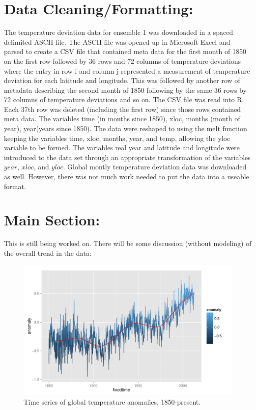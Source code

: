 \documentclass{article}\usepackage{graphicx, color}
\newenvironment{knitrout}{}{} %
\begin{document}
\section{Data Cleaning/Formatting:}
The temperature deviation data for ensemble 1 was downloaded in a spaced delimited ASCII file.  The ASCII file was opened up in Microsoft Excel and parsed to create a CSV file that contained meta data for the first month of 1850 on the first row followed by 36 rows and 72 columns of temperature deviations where the entry in row i and column j represented a measurement of temperature deviation for each latitude and longitude. This was followed by another row of metadata describing the second month of 1850 following by the same 36 rows by 72 columns of temperature deviations and so on. The CSV file was read into R. Each 37th row was deleted (including the first row) since those rows contained meta data. The variables time (in months since 1850), xloc, months (month of year), year(years since 1850). The data were reshaped to using the melt function keeping the variables time, xloc, months, year, and temp, allowing the yloc variable to be formed.  The variables real year and latitude and longitude were introduced to the data set through an appropriate transformation of the variables $year$, $xloc$, and $yloc$.
Global montly temperature deviation data was downloaded as well. However, there was not much work needed to put the data into a useable format.

\section{Main Section:}
This is still being worked on. There will be some discussion (without modeling) of the overall trend in the data: 
\begin{figure}[htb!]
\begin{knitrout}
\color{fgcolor}\includegraphics[width=\linewidth]{figure/plot-trend} 
\end{knitrout}

\caption{\label{trend}Time series of global temperature anomalies, 1850-present.}
\end{figure}
\end{document}
